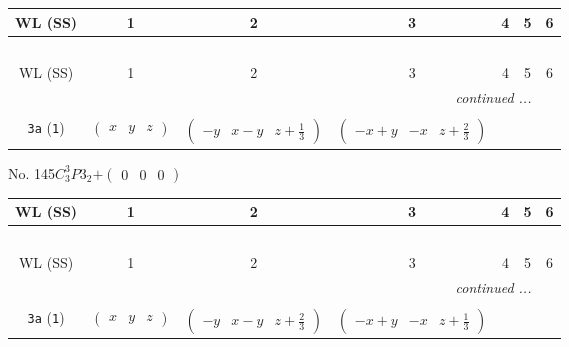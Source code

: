 \documentclass[fleqn,9pt,landscape]{jsarticle}
\begin{document}
\begin{center}
\renewcommand{\arraystretch}{1.2}
\begin{longtable}{ccccccc}
 \hline \hline
WL (SS) & 1 & 2 & 3 & 4 & 5 & 6 \\ \hline \endfirsthead

\multicolumn{6}{l}{\tablename\ \thetable{}} \\
 \hline \hline
WL (SS) & 1 & 2 & 3 & 4 & 5 & 6 \\ \hline \endhead

 \hline \hline
\multicolumn{6}{r}{\footnotesize\it continued ...} \\ \endfoot

 \hline \hline
\multicolumn{6}{r}{} \\ \endlastfoot

{\tt 3a} ({\tt 1}) & $ \begin{pmatrix} x & y & z \end{pmatrix} $ & $ \begin{pmatrix} - y & x - y & z + \frac{1}{3} \end{pmatrix} $ & $ \begin{pmatrix} - x + y & - x & z + \frac{2}{3} \end{pmatrix} $ \\
\end{longtable}
\end{center}
\newpage
No. 145\quad$C_{3}^{3}$\quad$P3_2$\quad[ trigonal ]\quad$+\begin{pmatrix} 0 & 0 & 0 \end{pmatrix}$
\begin{center}
\renewcommand{\arraystretch}{1.2}
\begin{longtable}{ccccccc}
 \hline \hline
WL (SS) & 1 & 2 & 3 & 4 & 5 & 6 \\ \hline \endfirsthead

\multicolumn{6}{l}{\tablename\ \thetable{}} \\
 \hline \hline
WL (SS) & 1 & 2 & 3 & 4 & 5 & 6 \\ \hline \endhead

 \hline \hline
\multicolumn{6}{r}{\footnotesize\it continued ...} \\ \endfoot

 \hline \hline
\multicolumn{6}{r}{} \\ \endlastfoot

{\tt 3a} ({\tt 1}) & $ \begin{pmatrix} x & y & z \end{pmatrix} $ & $ \begin{pmatrix} - y & x - y & z + \frac{2}{3} \end{pmatrix} $ & $ \begin{pmatrix} - x + y & - x & z + \frac{1}{3} \end{pmatrix} $ \\
\end{longtable}
\end{center}
\end{document}
